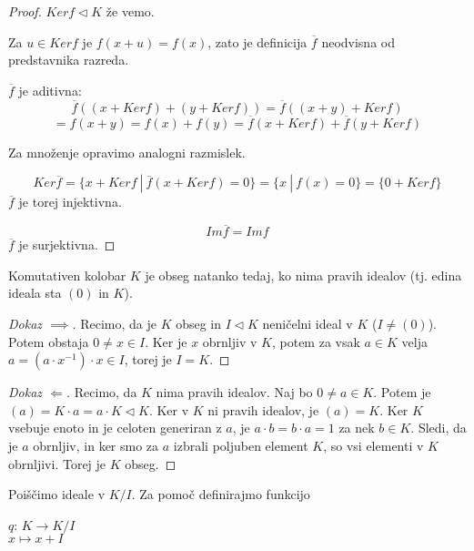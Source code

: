 \documentclass[11pt, a4paper]{article}
\begin{document}
    \begin{proof}
        \(Ker f \triangleleft K\) že vemo.
        \par
        Za \(u \in Ker f\) je \(f(x+u)=f(x)\), zato je definicija \(\overline{f}\) neodvisna od predstavnika razreda.
        \par
        \(\overline{f}\) je aditivna:
        \[\overline{f}((x + Ker f) + (y + Ker f)) = \overline{f}((x+y) + Ker f)\] \[= f(x+y) = f(x) + f(y) = \overline{f}(x + Ker f) + \overline{f}(y + Ker f)\]

        Za množenje opravimo analogni razmislek.

        \[Ker \overline{f} = \{x + Ker f\ |\ \overline{f}(x + Ker f) = 0 \} = \{x\ |\ f(x) = 0\} = \{0 + Ker f\}\]
        \(\overline{f}\) je torej injektivna.

        \[Im \overline{f} = Im f\]
        \(\overline{f}\) je surjektivna.
    \end{proof}

    \begin{proposition}
        Komutativen kolobar \(K\) je obseg natanko tedaj, ko nima pravih idealov (tj. edina ideala sta \((0)\) in \(K\)).
    \end{proposition}

    \begin{proof}[Dokaz \(\implies\)]
        Recimo, da je \(K\) obseg in \(I \triangleleft K\) neničelni ideal v \(K\) (\(I \neq (0)\)). Potem obstaja \(0 \neq x \in I\). Ker je \(x\) obrnljiv v \(K\), potem za vsak \(a \in K\) velja \(a = (a \cdot x^{-1}) \cdot x \in I\), torej je \(I = K\).
    \end{proof}

    \begin{proof}[Dokaz \(\Longleftarrow\)]
        Recimo, da \(K\) nima pravih idealov. Naj bo \(0 \neq a \in K\). Potem je \((a) = K \cdot a = a \cdot K \triangleleft K\). Ker v \(K\) ni pravih idealov, je \((a) = K\). Ker  \(K\) vsebuje enoto in je celoten generiran z \(a\), je \(a \cdot b = b \cdot a = 1\) za nek \(b \in K\). Sledi, da je \(a\) obrnljiv, in ker smo za \(a\) izbrali poljuben element \(K\), so vsi elementi v \(K\) obrnljivi. Torej je \(K\) obseg.
    \end{proof}

    Poiščimo ideale v \(K / I\). Za pomoč definirajmo funkcijo
    \begin{center}
        \(q\): \(K \to K/I\) \\
        \(x \mapsto x+I\) \\
    \end{center}
\end{document}
